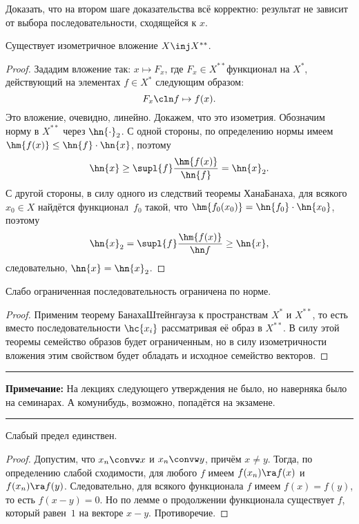 \documentclass[a4paper]{article}
\newcommand{\comment}[1]{\par\vskip2pt\hrule\vskip2pt{\footnotesize \textbf{Примечание:} #1\par}\vskip2pt\hrule\vskip2pt}
\begin{document}
\begin{problem}
Доказать, что на втором шаге доказательства всё корректно: результат не зависит от выбора
последовательности, сходящейся к $x$.
\end{problem}

\begin{lemma}
Существует изометричное вложение $X \inj X^{**}$.
\end{lemma}
\begin{proof}
Зададим вложение так: $x \mapsto F_x$, где $F_x \in X^{**}$\т функционал на $X^*$,
действующий на элементах $f \in X^*$ следующим образом:
$$F_x\cln f \mapsto f(x).$$
Это вложение, очевидно, линейно. Докажем, что это изометрия. Обозначим норму в $X^{**}$ через $\hn{\cdot}_2$.
С одной стороны, по определению нормы имеем $\hm{f(x)} \le \hn{f} \cdot \hn{x}$, поэтому
$$\hn{x} \ge \supl{f} \frac{\hm{f(x)}}{\hn{f}} = \hn{x}_2.$$
С другой стороны, в силу одного из следствий теоремы Хана\ч Банаха,
для всякого $x_0 \in X$ найдётся функционал~$f_0$ такой, что
$\hm{f_0(x_0)} = \hn{f_0} \cdot \hn{x_0}$, поэтому
$$\hn{x}_2 = \supl{f}\frac{\hm{f(x)}}{\hn f} \ge \hn{x},$$
следовательно, $\hn{x} = \hn{x}_2$.
\end{proof}

\begin{stm}
Слабо ограниченная последовательность ограничена по норме.
\end{stm}
\begin{proof}
Применим теорему Банаха\ч Штейнгауза к пространствам $X^*$ и $X^{**}$,
то есть вместо последовательности $\hc{x_i}$ рассматривая её образ в $X^{**}$.
В силу этой теоремы семейство образов будет ограниченным, но в силу изометричности вложения
этим свойством будет обладать и исходное семейство векторов.
\end{proof}

\comment{На лекциях следующего утверждения не было, но наверняка было на семинарах.
А кому\д нибудь, возможно, попадётся на экзамене.}

\begin{stm}
Слабый предел единствен.
\end{stm}
\begin{proof}
Допустим, что $x_n \convw x$ и $x_n \convw y$, причём $x \neq y$. Тогда, по определению
слабой сходимости, для любого $f$ имеем $f(x_n) \ra f(x)$ и $f(x_n) \ra f(y)$. Следовательно,
для всякого функционала $f$ имеем $f(x) = f(y)$, то есть $f(x-y) = 0$.
Но по лемме о продолжении функционала существует $f$, который равен~$1$ на  векторе $x-y$.
Противоречие.
\end{proof}
\end{document}
